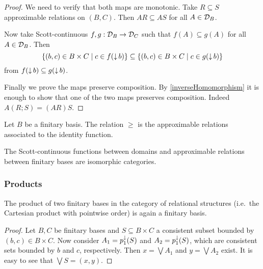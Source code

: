 \begin{proof}
We need to verify that both maps are monotonic. Take $R\subseteq S$ approximable relations on $(B,C)$. Then $AR \subseteq AS$ for all $A\in \mathcal{D}_B$.

Now take Scott-continuous $f,g: \mathcal{D}_B\to \mathcal{D}_C$ such that $f(A)\subseteq g(A)$ for all $A\in \mathcal{D}_B$. Then
\[ \setbuilder{(b,c)\in B\times C}{c\in f(\downset b)} \subseteq \setbuilder{(b,c)\in B\times C}{c\in g(\downset b)} \]
from $f(\operatorname{\downarrow} b) \subseteq g(\operatorname{\downarrow} b)$.

Finally we prove the maps preserve composition. By \ref{inverseHomomorphism} it is enough to show that one of the two maps preserves composition. Indeed $A(R;S) = (AR)S$.
\end{proof}
\begin{corollary}
Let $B$ be a finitary basis. The relation $\geq$ is the approximable relations associated to the identity function.
\end{corollary}
\begin{corollary}
The Scott-continuous functions between domains and approximable relations between finitary bases are isomorphic categories.
\end{corollary}

\subsubsection{Products}
\begin{lemma}
The product of two finitary bases in the category of relational structures (i.e.\ the Cartesian product with pointwise order) is again a finitary basis.
\end{lemma}
\begin{proof}
Let $B,C$ be finitary bases and $S\subseteq B\times C$ a consistent subset bounded by $(b,c)\in B\times C$. Now consider $A_1 = p_1^{\downarrow}(S)$ and $A_2 = p_1^{\downarrow}(S)$, which are consistent sets bounded by $b$ and $c$, respectively. Then $x = \bigvee A_1$ and $y = \bigvee A_2$ exist. It is easy to see that $\bigvee S = (x,y)$.
\end{proof}

